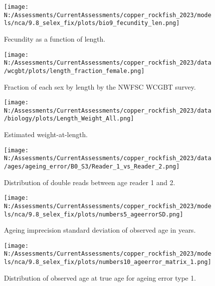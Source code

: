 \documentclass[11pt,
  english,
  letterpaper,
]{article}
\begin{document}
\pagebreak

\begin{figure}
\centering
\texttt{[image: N:/Assessments/CurrentAssessments/copper\_rockfish\_2023/models/nca/9.8\_selex\_fix/plots/bio9\_fecundity\_len.png]}
\caption{Fecundity as a function of length.\label{fig:fecundity}}
\end{figure}

\pagebreak

\begin{figure}
\centering
\texttt{[image: N:/Assessments/CurrentAssessments/copper\_rockfish\_2023/data/wcgbt/plots/length\_fraction\_female.png]}
\caption{Fraction of each sex by length by the NWFSC WCGBT survey.\label{fig:frac-sex-len}}
\end{figure}

\pagebreak

\begin{figure}
\centering
\texttt{[image: N:/Assessments/CurrentAssessments/copper\_rockfish\_2023/data/biology/plots/Length\_Weight\_All.png]}
\caption{Estimated weight-at-length.\label{fig:weight-length}}
\end{figure}

\pagebreak

\begin{figure}
\centering
\texttt{[image: N:/Assessments/CurrentAssessments/copper\_rockfish\_2023/data/ages/ageing\_error/B0\_S3/Reader\_1\_vs\_Reader\_2.png]}
\caption{Distribution of double reads between age reader 1 and 2.\label{fig:age-error-dist}}
\end{figure}

\pagebreak

\begin{figure}
\centering
\texttt{[image: N:/Assessments/CurrentAssessments/copper\_rockfish\_2023/models/nca/9.8\_selex\_fix/plots/numbers5\_ageerrorSD.png]}
\caption{Ageing imprecision standard deviation of observed age in years.\label{fig:age-error}}
\end{figure}

\pagebreak

\begin{figure}
\centering
\texttt{[image: N:/Assessments/CurrentAssessments/copper\_rockfish\_2023/models/nca/9.8\_selex\_fix/plots/numbers10\_ageerror\_matrix\_1.png]}
\caption{Distribution of observed age at true age for ageing error type 1.\label{fig:age-error-matrix}}
\end{figure}
\end{document}
